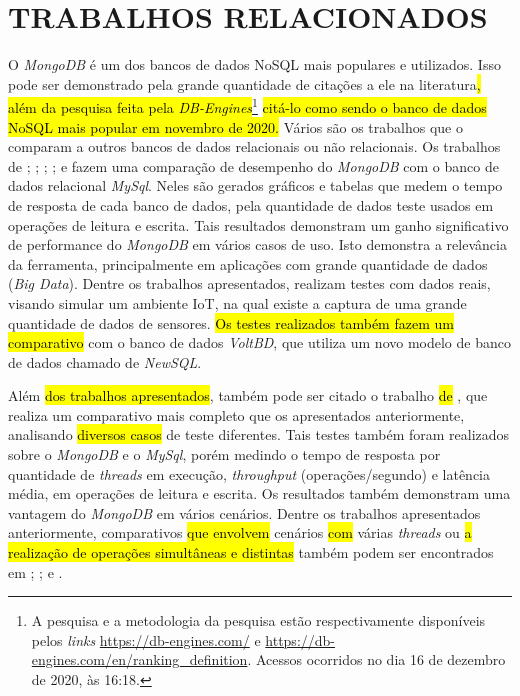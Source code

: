 \chapter{TRABALHOS RELACIONADOS}
\label{TrabalhosRelacionados}

O \textit{MongoDB} é um dos bancos de dados NoSQL mais populares e utilizados. Isso pode ser demonstrado pela grande quantidade de citações a ele na literatura\hl{, além da pesquisa feita pela \textit{DB-Engines}}\footnote{A pesquisa e a metodologia da pesquisa estão respectivamente disponíveis pelos \textit{links} \url{https://db-engines.com/} e \url{https://db-engines.com/en/ranking_definition}. Acessos ocorridos no dia 16 de dezembro de 2020, às 16:18.} \hl{citá-lo como sendo o banco de dados NoSQL mais popular em novembro de 2020.} Vários são os trabalhos que o comparam a outros bancos de dados relacionais ou não relacionais. Os trabalhos de ; ; ; ; e  fazem uma comparação de desempenho do \textit{MongoDB} com o banco de dados relacional \textit{MySql}. Neles são gerados gráficos e tabelas que medem o tempo de resposta de cada banco de dados, pela quantidade de dados teste usados em operações de leitura e escrita. \hl{ } Tais resultados demonstram um ganho significativo de performance do \textit{MongoDB} em vários casos de uso. Isto demonstra a relevância da ferramenta, principalmente em aplicações com grande quantidade de dados (\textit{Big Data}). Dentre os trabalhos apresentados,  realizam testes com dados reais, visando simular um ambiente IoT, na qual existe a captura de uma grande quantidade de dados de sensores. \hl{Os testes realizados também fazem um comparativo} com o banco de dados \textit{VoltBD}, que utiliza um novo modelo de banco de dados chamado de \textit{NewSQL}.

Além \hl{dos trabalhos apresentados}, também pode ser citado o trabalho \hl{de} , que realiza um comparativo mais completo que os apresentados anteriormente, analisando \hl{diversos casos} de teste diferentes. Tais testes também foram realizados sobre o \textit{MongoDB} e o \textit{MySql}, porém medindo o tempo de resposta por quantidade de \textit{threads} em execução, \textit{throughput} (operações/segundo) e latência média, em operações de leitura e escrita. Os resultados também demonstram uma vantagem do \textit{MongoDB} em vários cenários. Dentre os trabalhos apresentados anteriormente, comparativos \hl{que envolvem} cenários \hl{com} várias \textit{threads} ou \hl{a realização de operações simultâneas e distintas} também podem ser encontrados em ; ; e .

